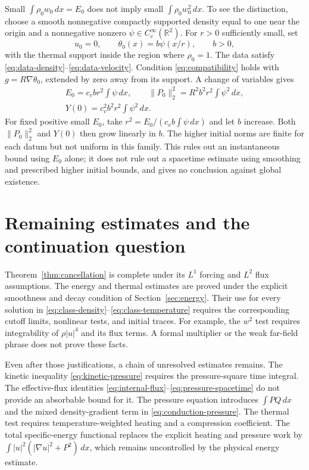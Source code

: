 \documentclass[10pt,twoside]{article}
\newcommand{\R}{\mathbb R}
\newcommand{\dd}{\,dx}
\newcommand{\norm}[2]{\lVert#1\rVert_{#2}}
\begin{document}
Small $\int\rho_0w_0\dd=E_0$ does not imply small
$\int\rho_0w_0^2\dd$. To see the distinction, choose a smooth
nonnegative compactly supported density equal to one near the origin
and a nonnegative nonzero $\psi\in C_c^\infty(\R^2)$.
For $r>0$ sufficiently small, set
\[
 u_0=0,\qquad \theta_0(x)=b\psi(x/r),\qquad b>0,
\]
with the thermal support inside the region where $\rho_0=1$.
The data satisfy \eqref{eq:data-density}--\eqref{eq:data-velocity}.
Condition \eqref{eq:compatibility} holds with $g=R\nabla\theta_0$,
extended by zero away from its support.
A change of variables gives
\begin{equation}\label{eq:concentration}
 \begin{gathered}
 E_0=c_vbr^2\int\psi\dd,\qquad
 \norm{P_0}{2}^2=R^2b^2r^2\int\psi^2\dd,\\
 Y(0)=c_v^2b^2r^2\int\psi^2\dd.
 \end{gathered}
\end{equation}
For fixed positive small $E_0$, take
$r^2=E_0/(c_vb\int\psi\dd)$ and let $b$ increase.
Both $\norm{P_0}{2}^2$ and $Y(0)$ then grow linearly in $b$.
The higher initial norms are finite for each datum but not uniform in
this family. This rules out an instantaneous bound using $E_0$ alone;
it does not rule out a spacetime estimate using smoothing and prescribed
higher initial bounds, and gives no conclusion against global existence.

\section{Remaining estimates and the continuation question}
Theorem~\ref{thm:cancellation} is complete under its $L^1$ forcing and
$L^2$ flux assumptions. The energy and thermal estimates are proved under the explicit
smoothness and decay condition of Section~\ref{sec:energy}. Their use for every solution in
\eqref{eq:class-density}--\eqref{eq:class-temperature} requires the
corresponding cutoff limits, nonlinear tests, and initial traces.
For example, the $w^2$ test requires integrability of $\rho|u|^4$
and its flux terms. A formal multiplier or the weak far-field phrase
does not prove these facts.

Even after those justifications, a chain of unresolved estimates remains.
The kinetic inequality \eqref{eq:kinetic-pressure} requires the
pressure-square time integral. The effective-flux identities
\eqref{eq:internal-flux}--\eqref{eq:pressure-spacetime} do not provide
an absorbable bound for it. The pressure equation introduces
$\int PQ\dd$ and the mixed density-gradient term in
\eqref{eq:conduction-pressure}. The thermal test requires
temperature-weighted heating and a compression coefficient.
The total specific-energy functional replaces the explicit heating
and pressure work by $\int|u|^2(|\nabla u|^2+P^2)\dd$,
which remains uncontrolled by the physical energy estimate.
\end{document}
